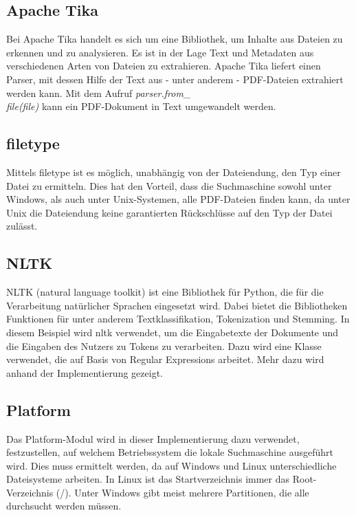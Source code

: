 \subsection{Apache Tika}\label{apache-tika}
Bei Apache Tika handelt es sich um eine Bibliothek, um Inhalte aus Dateien zu erkennen und zu analysieren. Es ist in der Lage Text und Metadaten aus verschiedenen Arten von Dateien zu extrahieren. Apache Tika liefert einen Parser, mit dessen Hilfe der Text aus - unter anderem - PDF-Dateien extrahiert werden kann. Mit dem Aufruf \emph{parser.from\_\\file(file)} kann ein PDF-Dokument in Text umgewandelt werden.

\subsection{filetype}\label{python-magic}
Mittels filetype ist es möglich, unabhängig von der Dateiendung, den Typ einer Datei zu ermitteln. Dies hat den Vorteil, dass die Suchmaschine sowohl unter Windows, als auch unter Unix-Systemen, alle PDF-Dateien finden kann, da unter Unix die Dateiendung keine garantierten Rückschlüsse auf den Typ der Datei zulässt.

\subsection{NLTK}\label{nltk}
NLTK (natural language toolkit) ist eine Bibliothek für Python, die für die Verarbeitung natürlicher Sprachen eingesetzt wird. Dabei bietet die Bibliotheken Funktionen für unter anderem Textklassifikation, Tokenization und Stemming.
In diesem Beispiel wird nltk verwendet, um die Eingabetexte der Dokumente und die Eingaben des Nutzers zu Tokens zu verarbeiten. Dazu wird eine Klasse verwendet, die auf Basis von Regular Expressions arbeitet. Mehr dazu wird anhand der Implementierung gezeigt. %

\subsection{Platform}
Das Platform-Modul wird in dieser Implementierung dazu verwendet, festzustellen, auf welchem Betriebssystem die lokale Suchmaschine ausgeführt wird. Dies muss ermittelt werden, da auf Windows und Linux unterschiedliche Dateisysteme arbeiten. In Linux ist das Startverzeichnis immer das Root-Verzeichnis (\glqq /\grqq). Unter Windows gibt meist mehrere Partitionen, die alle durchsucht werden müssen.

